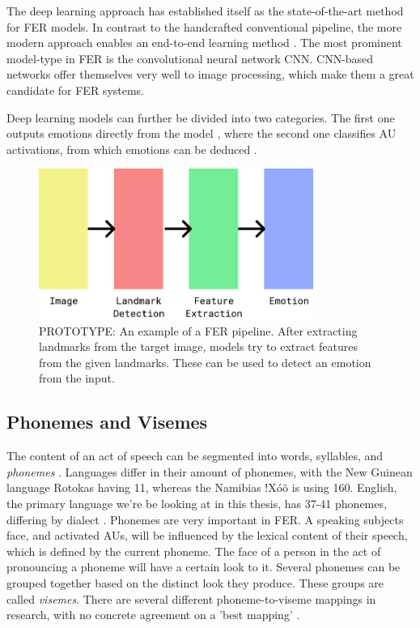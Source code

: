 The deep learning approach has established itself as the state-of-the-art method for FER models. In contrast to the handcrafted conventional pipeline, the more modern approach enables an end-to-end learning method \cite{ko2018brief}. The most prominent model-type in FER is the convolutional neural network CNN. CNN-based networks offer themselves very well to image processing, which make them a great candidate for FER systems. 

Deep learning models can further be divided into two categories. The first one outputs emotions directly from the model \cite{ebrahimi2015recurrent} \cite{kim2017multi} \cite{jung2015joint}, where the second one classifies AU activations, from which emotions can be deduced \cite{breuer2017deep} \cite{zhao2016deep} \cite{chu2017learning}. 

\begin{figure}
    \centering
    \includegraphics[width=0.8\textwidth]{res/PipelinePrototype.pdf}
    \caption{PROTOTYPE: An example of a FER pipeline. After extracting landmarks from the target image, models try to extract features from the given landmarks. These can be used to detect an emotion from the input.}
    \label{fig:pipeline_fer}
\end{figure}

\subsection{Phonemes and Visemes}
The content of an act of speech can be segmented into words, syllables, and \emph{phonemes} \cite{savin1970nonperceptual}. Languages differ in their amount of phonemes, with the New Guinean language Rotokas having 11, whereas the Namibias !Xóõ is using 160. English, the primary language we're be looking at in this thesis, has 37-41 phonemes, differing by dialect \cite{Hayes2009}. Phonemes are very important in FER. A speaking subjects face, and activated AUs, will be influenced by the lexical content of their speech, which is defined by the current phoneme. The face of a person in the act of pronouncing a phoneme will have a certain look to it. Several phonemes can be grouped together based on the distinct look they produce. These groups are called \emph{visemes}. There are several different phoneme-to-viseme mappings in research, with no concrete agreement on a 'best mapping' \cite{cappelletta2012viseme}.

